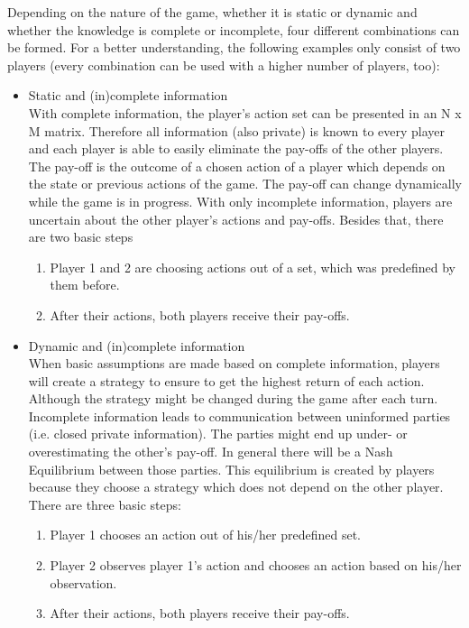 Depending on the nature of the game, whether it is static or dynamic and whether the knowledge is complete or incomplete, four different combinations can be formed.
For a better understanding, the following examples only consist of two players (every combination can be used with a higher number of players, too):

\begin{itemize}
	\item Static and (in)complete information\\
	With complete information, the player's action set can be presented in an N x M matrix.
	Therefore all information (also private) is known to every player and each player is able to easily eliminate the pay-offs of the 		
	other players. The pay-off is the outcome of a chosen action of a player which depends on the state or previous actions of 
	the game. The pay-off can change dynamically while the game is in progress.
	With only incomplete information, players are uncertain about the other player's actions and pay-offs.
	Besides that, there are two basic steps
	\begin{enumerate}
		\item Player 1 and 2 are choosing actions out of a set, which was predefined by them before.
		\item After their actions, both players receive their pay-offs.
	\end{enumerate}
	\item Dynamic and (in)complete information\\
	When basic assumptions are made based on complete information, players will create a strategy to ensure to get the highest return of each action. 
	Although the strategy might be changed during the game after each turn.
	Incomplete information leads to communication between uninformed parties (i.e. closed private information). The parties might end up under- or overestimating the other's pay-off. 
	In general there will be a Nash Equilibrium between those parties. 
	This equilibrium is created by players because they choose a strategy which does not depend on the other player. 
	There are three basic steps: 
	\begin{enumerate}
		\item Player 1 chooses an action out of his/her predefined set.
		\item Player 2 observes player 1's action and chooses an action based on his/her observation.
		\item After their actions, both players receive their pay-offs.
	\end{enumerate}
\end{itemize}

